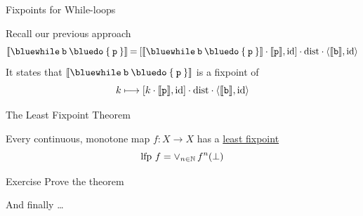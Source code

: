 \documentclass{beamer}
\begin{document}
\begin{frame}{Fixpoints for While-loops}

        \begin{center}
        \end{center}

        \pause
        \bigskip
        Recall our previous approach
        \[
                \sem{\mathtt{{\blue while} \> b \> {\blue do} \> \{ \> p \> \}} }
                                                         \> {=} \>
                [\sem{\mathtt{{\blue while} \> b \> {\blue do} \> \{ \> p \> \}} } \comp 
                \sem{\prog{p}},\id] \comp
                \mathrm{dist} \comp \pv{\sem{\prog{b}}}{\id}
        \]
        It states that $\sem{\mathtt{{\blue while} \> b \> {\blue do} \> \{ \>
        p \> \}} }$ is a fixpoint of 
        \[
               k \longmapsto 
               [k \cdot 
               \llbracket \mathtt{p} \rrbracket,\mathrm{id}] \cdot
               \mathrm{dist} \cdot \langle \llbracket \mathtt{b} \rrbracket, \mathrm{id} \rangle
        \]
\end{frame}

\begin{frame}{The Least Fixpoint Theorem}
        
        \begin{theorem}
        Every continuous, monotone map $f : X \to X$ has
        a \alert{\underline{least fixpoint}}
        \[
                \mathrm{lfp}\ f = \vee_{n \in \mathbb{N}}\, f^n(\bot)
        \]
        \end{theorem}

        \begin{block}{Exercise}
                Prove the theorem
        \end{block}

        \bigskip
        \pause
        And finally \dots
\end{frame}
\end{document}

